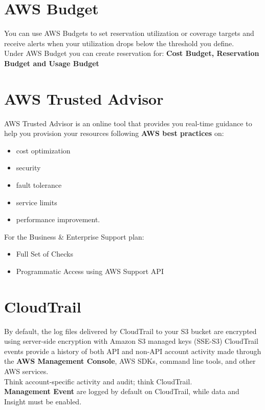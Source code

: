 \documentclass[12pt, letterpaper, twoside]{article}
\begin{document}
\section{AWS  Budget}
You can use AWS Budgets to set reservation utilization or coverage targets and receive alerts when your 
utilization drops below the threshold you define.\\
Under AWS Budget you can create reservation for: \textbf{Cost Budget, Reservation Budget and Usage Budget}

\section{AWS Trusted Advisor}
AWS Trusted Advisor is an online tool that provides you real-time guidance to help you provision your resources 
following \textbf{AWS best practices} on:
\begin{itemize}
	\item cost optimization
	\item security
	\item fault tolerance
	\item service limits
	\item performance improvement.
\end{itemize}
For the Business \& Enterprise Support plan:
\begin{itemize}
	\item Full Set of Checks
	\item Programmatic Access using AWS Support API
\end{itemize}

\section{CloudTrail}
By default, the log files delivered by CloudTrail to your S3 bucket are encrypted using server-side encryption with Amazon S3 managed keys (SSE-S3)
CloudTrail events provide a history of both API and non-API account activity made through the \textbf{AWS Management Console}, 
AWS SDKs, command line tools, and other AWS services.\\
Think account-specific activity and audit; think CloudTrail.\\
\textbf{Management Event} are logged by default on CloudTrail, while data and Insight must be enabled.\\
\end{document}
